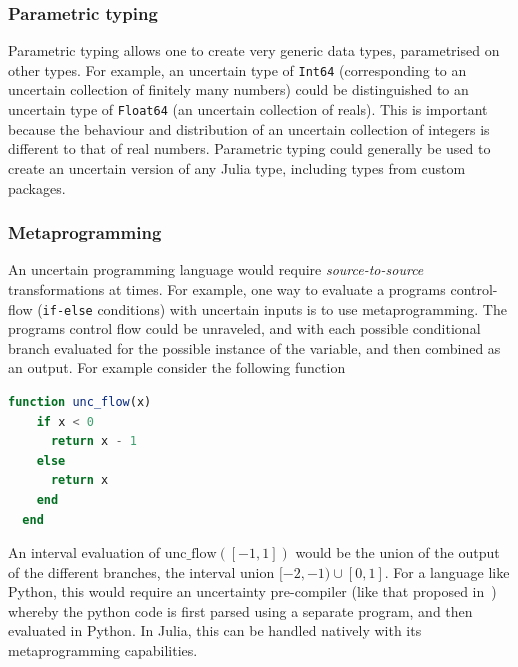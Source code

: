 \documentclass{juliacon}
\begin{document}
\subsubsection{Parametric typing}
Parametric typing allows one to create very generic data types, parametrised on other types. For example, an uncertain type of \texttt{Int64} (corresponding to an uncertain collection of finitely many numbers) could be distinguished to an uncertain type of \texttt{Float64} (an uncertain collection of reals). This is important because the behaviour and distribution of an uncertain collection of integers is different to that of real numbers. Parametric typing could generally be used to create an uncertain version of any Julia type, including types from custom packages.

\subsubsection{Metaprogramming}
An uncertain programming language would require \textit{source-to-source} transformations at times. For example, one way to evaluate a programs control-flow (\texttt{if-else} conditions) with uncertain inputs is to use metaprogramming. The programs control flow could be unraveled, and with each possible conditional branch evaluated for the possible instance of the variable, and then combined as an output. For example consider the following function
\begin{lstlisting}[language = Julia]
  function unc_flow(x)
    if x < 0 
      return x - 1
    else 
      return x
    end
  end
\end{lstlisting}
\noindent An interval evaluation of $\text{unc\_flow}([-1,1])$ would be the union of the output of the different branches, the interval union $[-2, -1) \cup [0, 1]$. For a language like Python, this would require an uncertainty pre-compiler (like that proposed in~\cite{gray2019computing}) whereby the python code is first parsed using a separate program, and then evaluated in Python. In Julia, this can be handled natively with its metaprogramming capabilities.
\end{document}
